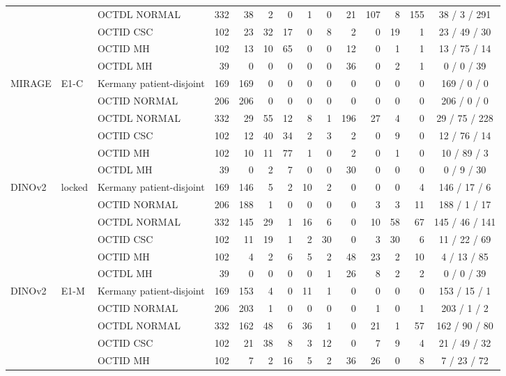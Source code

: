 \begin{longtable}{@{}lll rrrrrrrrrrc@{}}
 &  & OCTDL NORMAL & 332 & 38 & 2 & 0 & 1 & 0 & 21 & 107 & 8 & 155 & 38 / 3 / 291 \\
 &  & OCTID CSC & 102 & 23 & 32 & 17 & 0 & 8 & 2 & 0 & 19 & 1 & 23 / 49 / 30 \\
 &  & OCTID MH & 102 & 13 & 10 & 65 & 0 & 0 & 12 & 0 & 1 & 1 & 13 / 75 / 14 \\
 &  & OCTDL MH & 39 & 0 & 0 & 0 & 0 & 0 & 36 & 0 & 2 & 1 & 0 / 0 / 39 \\
\addlinespace[1pt]
MIRAGE & E1-C & Kermany patient-disjoint & 169 & 169 & 0 & 0 & 0 & 0 & 0 & 0 & 0 & 0 & 169 / 0 / 0 \\
 &  & OCTID NORMAL & 206 & 206 & 0 & 0 & 0 & 0 & 0 & 0 & 0 & 0 & 206 / 0 / 0 \\
 &  & OCTDL NORMAL & 332 & 29 & 55 & 12 & 8 & 1 & 196 & 27 & 4 & 0 & 29 / 75 / 228 \\
 &  & OCTID CSC & 102 & 12 & 40 & 34 & 2 & 3 & 2 & 0 & 9 & 0 & 12 / 76 / 14 \\
 &  & OCTID MH & 102 & 10 & 11 & 77 & 1 & 0 & 2 & 0 & 1 & 0 & 10 / 89 / 3 \\
 &  & OCTDL MH & 39 & 0 & 2 & 7 & 0 & 0 & 30 & 0 & 0 & 0 & 0 / 9 / 30 \\
\addlinespace[1pt]
DINOv2 & locked & Kermany patient-disjoint & 169 & 146 & 5 & 2 & 10 & 2 & 0 & 0 & 0 & 4 & 146 / 17 / 6 \\
 &  & OCTID NORMAL & 206 & 188 & 1 & 0 & 0 & 0 & 0 & 3 & 3 & 11 & 188 / 1 / 17 \\
 &  & OCTDL NORMAL & 332 & 145 & 29 & 1 & 16 & 6 & 0 & 10 & 58 & 67 & 145 / 46 / 141 \\
 &  & OCTID CSC & 102 & 11 & 19 & 1 & 2 & 30 & 0 & 3 & 30 & 6 & 11 / 22 / 69 \\
 &  & OCTID MH & 102 & 4 & 2 & 6 & 5 & 2 & 48 & 23 & 2 & 10 & 4 / 13 / 85 \\
 &  & OCTDL MH & 39 & 0 & 0 & 0 & 0 & 1 & 26 & 8 & 2 & 2 & 0 / 0 / 39 \\
\addlinespace[1pt]
DINOv2 & E1-M & Kermany patient-disjoint & 169 & 153 & 4 & 0 & 11 & 1 & 0 & 0 & 0 & 0 & 153 / 15 / 1 \\
 &  & OCTID NORMAL & 206 & 203 & 1 & 0 & 0 & 0 & 0 & 1 & 0 & 1 & 203 / 1 / 2 \\
 &  & OCTDL NORMAL & 332 & 162 & 48 & 6 & 36 & 1 & 0 & 21 & 1 & 57 & 162 / 90 / 80 \\
 &  & OCTID CSC & 102 & 21 & 38 & 8 & 3 & 12 & 0 & 7 & 9 & 4 & 21 / 49 / 32 \\
 &  & OCTID MH & 102 & 7 & 2 & 16 & 5 & 2 & 36 & 26 & 0 & 8 & 7 / 23 / 72 \\

\end{longtable}
